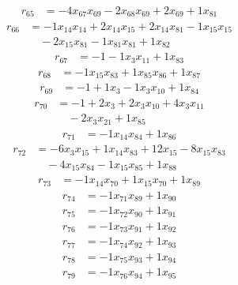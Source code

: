 \[\begin{aligned}
r_{65} &= - 4 x_{67} x_{69} - 2 x_{68} x_{69} + 2 x_{69} + 1 x_{81}
\end{aligned}\]
\[\begin{aligned}
r_{66} &= - 1 x_{14} x_{14} + 2 x_{14} x_{15} + 2 x_{14} x_{81} - 1 x_{15} x_{15} \\
 &\quad - 2 x_{15} x_{81} - 1 x_{81} x_{81} + 1 x_{82}
\end{aligned}\]
\[\begin{aligned}
r_{67} &= - 1 - 1 x_{3} x_{11} + 1 x_{83}
\end{aligned}\]
\[\begin{aligned}
r_{68} &= - 1 x_{15} x_{83} + 1 x_{85} x_{86} + 1 x_{87}
\end{aligned}\]
\[\begin{aligned}
r_{69} &= - 1 + 1 x_{3} - 1 x_{3} x_{10} + 1 x_{84}
\end{aligned}\]
\[\begin{aligned}
r_{70} &= - 1 + 2 x_{3} + 2 x_{3} x_{10} + 4 x_{3} x_{11} \\
 &\quad - 2 x_{3} x_{21} + 1 x_{85}
\end{aligned}\]
\[\begin{aligned}
r_{71} &= - 1 x_{14} x_{84} + 1 x_{86}
\end{aligned}\]
\[\begin{aligned}
r_{72} &= - 6 x_{3} x_{15} + 1 x_{14} x_{83} + 12 x_{15} - 8 x_{15} x_{83} \\
 &\quad - 4 x_{15} x_{84} - 1 x_{15} x_{85} + 1 x_{88}
\end{aligned}\]
\[\begin{aligned}
r_{73} &= - 1 x_{14} x_{70} + 1 x_{15} x_{70} + 1 x_{89}
\end{aligned}\]
\[\begin{aligned}
r_{74} &= - 1 x_{71} x_{89} + 1 x_{90}
\end{aligned}\]
\[\begin{aligned}
r_{75} &= - 1 x_{72} x_{90} + 1 x_{91}
\end{aligned}\]
\[\begin{aligned}
r_{76} &= - 1 x_{73} x_{91} + 1 x_{92}
\end{aligned}\]
\[\begin{aligned}
r_{77} &= - 1 x_{74} x_{92} + 1 x_{93}
\end{aligned}\]
\[\begin{aligned}
r_{78} &= - 1 x_{75} x_{93} + 1 x_{94}
\end{aligned}\]
\[\begin{aligned}
r_{79} &= - 1 x_{76} x_{94} + 1 x_{95}
\end{aligned}\]
